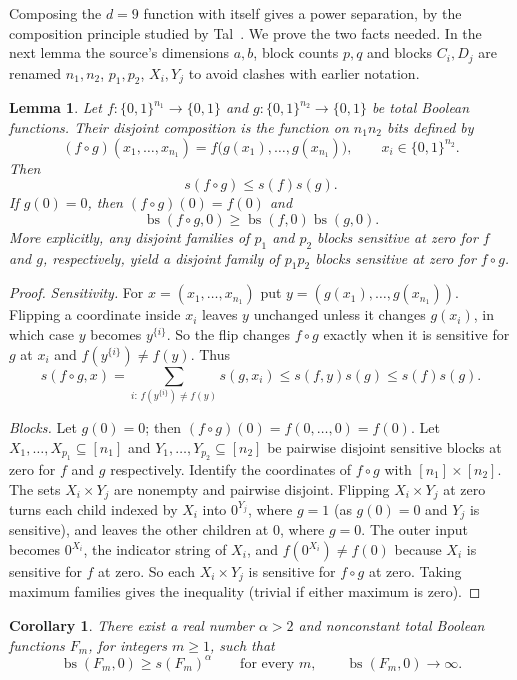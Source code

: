 \documentclass[11pt]{article}
\newcommand{\bs}{\operatorname{bs}}
\newtheorem{lemma}[theorem]{Lemma}
\newtheorem{corollary}[theorem]{Corollary}
\theoremstyle{definition}
\theoremstyle{remark}
\begin{document}
Composing the $d=9$ function with itself gives a power separation, by the
composition principle studied by Tal~\cite{Tal2013}. We prove the two facts
needed. In the next lemma the source's dimensions $a,b$, block counts $p,q$
and blocks $C_i,D_j$ are renamed $n_1,n_2$, $p_1,p_2$, $X_i,Y_j$ to avoid
clashes with earlier notation.

\begin{lemma}
\label{lem:composition}
Let $f:\{0,1\}^{n_1}\to\{0,1\}$ and
$g:\{0,1\}^{n_2}\to\{0,1\}$ be total Boolean functions.
Their disjoint composition is the function on $n_1n_2$ bits defined by
\[
 (f\circ g)(x_1,\ldots,x_{n_1})
   =f\bigl(g(x_1),\ldots,g(x_{n_1})\bigr),
 \qquad x_i\in\{0,1\}^{n_2}.
\]
Then
\[
 s(f\circ g)\leq s(f)s(g).
\]
If $g(0)=0$, then $(f\circ g)(0)=f(0)$ and
\[
 \bs(f\circ g,0)\geq\bs(f,0)\bs(g,0).
\]
More explicitly, any disjoint families of $p_1$ and $p_2$ blocks sensitive at
zero for $f$ and $g$, respectively, yield a disjoint family of $p_1p_2$ blocks
sensitive at zero for $f\circ g$.
\end{lemma}

\begin{proof}
\emph{Sensitivity.} For $x=(x_1,\ldots,x_{n_1})$ put
$y=(g(x_1),\ldots,g(x_{n_1}))$. Flipping a coordinate inside $x_i$ leaves $y$
unchanged unless it changes $g(x_i)$, in which case $y$ becomes $y^{\{i\}}$.
So the flip changes $f\circ g$ exactly when it is sensitive for $g$ at $x_i$
and $f(y^{\{i\}})\ne f(y)$. Thus
\[
 s(f\circ g,x)
   =\sum_{i:\,f(y^{\{i\}})\ne f(y)}s(g,x_i)
   \leq s(f,y)s(g)
   \leq s(f)s(g).
\]

\emph{Blocks.} Let $g(0)=0$; then $(f\circ g)(0)=f(0,\ldots,0)=f(0)$. Let
$X_1,\ldots,X_{p_1}\subseteq[n_1]$ and $Y_1,\ldots,Y_{p_2}\subseteq[n_2]$ be
pairwise disjoint sensitive blocks at zero for $f$ and $g$ respectively.
Identify the coordinates of $f\circ g$ with $[n_1]\times[n_2]$. The sets
$X_i\times Y_j$ are nonempty and pairwise disjoint. Flipping $X_i\times Y_j$
at zero turns each child indexed by $X_i$ into $0^{Y_j}$, where $g=1$ (as
$g(0)=0$ and $Y_j$ is sensitive), and leaves the other children at $0$, where
$g=0$. The outer input becomes $0^{X_i}$, the indicator string of $X_i$, and
$f(0^{X_i})\ne f(0)$ because $X_i$ is sensitive for $f$ at zero. So each
$X_i\times Y_j$ is sensitive for $f\circ g$ at zero. Taking maximum families
gives the inequality (trivial if either maximum is zero).
\end{proof}

\begin{corollary}
\label{cor:power-separation}
There exist a real number $\alpha>2$ and nonconstant total Boolean
functions $F_m$, for integers $m\geq1$, such that
\[
 \bs(F_m,0)\geq s(F_m)^\alpha
 \qquad\text{for every }m,
 \qquad
 \bs(F_m,0)\longrightarrow\infty.
\]
\end{corollary}
\end{document}

